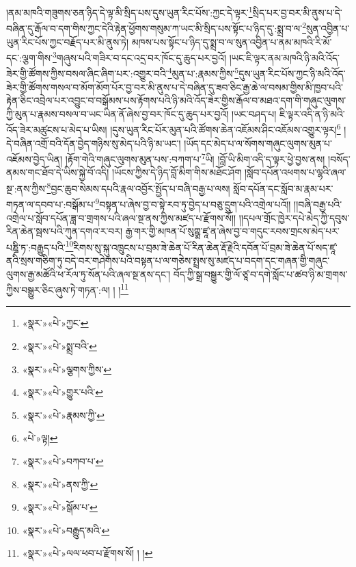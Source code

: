 །ནམ་མཁའི་གཟུགས་ཅན་ཉིད་དེ་ལྟ་མི་སྲིད་པས་དུས་ཡུན་རིང་པོས་:ཀྱང་དེ་ལྟར་\footnote{«སྣར་»«པེ་»ཀྱང་}སྲིད་པར་བྱ་བར་མི་ནུས་པ་དེ་བཞིན་དུ་རྒོལ་བ་དག་གིས་ཀྱང་དེའི་རྟེན་ཕྱོགས་གསུམ་ཀ་ཡང་མི་སྲིད་པས་སྟོང་པ་ཉིད་དུ་:སྨྲ་བ་ལ་\footnote{«སྣར་»«པེ་»སྨྲ་བའི་}སུན་འབྱིན་པ་ཡུན་རིང་པོས་ཀྱང་བརྗོད་པར་མི་ནུས་ཏེ། མཁས་པས་སྟོང་པ་ཉིད་དུ་སྨྲ་བ་ལ་སུན་འབྱིན་པ་ནམ་མཁའི་རི་མོ་དང་:ལྕག་གིས་\footnote{«སྣར་»«པེ་»ལྕགས་ཀྱིས་}གཞུས་པའི་གཟིར་བ་དང་འདྲ་བར་ཁོང་དུ་ཆུད་པར་བྱའོ། །ཡང་ཇི་ལྟར་ནམ་མཁའི་ཉི་མའི་འོད་ཟེར་གྱི་ཚོགས་ཀྱིས་བསལ་ཞིང་ཞིག་པར་:འགྱུར་བའི་\footnote{«སྣར་»«པེ་»གྱུར་པའི་}མུན་པ་:རྣམས་ཀྱིས་\footnote{«སྣར་»«པེ་»རྣམས་ཀྱི་}དུས་ཡུན་རིང་པོས་ཀྱང་ཉི་མའི་འོད་ཟེར་གྱི་ཚོགས་གསལ་བ་མོག་མོག་པོར་བྱ་བར་མི་ནུས་པ་དེ་བཞིན་དུ་ཟབ་ཅིང་རྒྱ་ཆེ་ལ་བསམ་གྱིས་མི་ཁྱབ་པའི་རྟེན་ཅིང་འབྲེལ་པར་འབྱུང་བ་བསྒོམས་པས་རྟོགས་པའི་ཉི་མའི་འོད་ཟེར་གྱིས་རྒོལ་བ་མཐའ་དག་གི་གཞུང་ལུགས་ཀྱི་མུན་པ་རྣམས་བསལ་བ་ཡང་ཡིན་ནོ་ཞེས་བྱ་བར་ཁོང་དུ་ཆུད་པར་བྱའོ། །ཡང་བཤད་པ། ཇི་ལྟར་འདི་ན་ཉི་མའི་འོད་ཟེར་མཚུངས་པ་མེད་པ་ཡིས། །དུས་ཡུན་རིང་པོར་མུན་པའི་ཚོགས་ཆེན་འཇོམས་ཤིང་འཇོམས་འགྱུར་ལྟར།\footnote{«པེ་»ལྟ།} །དེ་བཞིན་འགྲོ་བའི་དོན་བྱེད་གཉིས་སུ་མེད་པའི་ཉི་མ་ཡང་། །ཡོད་དང་མེད་པ་ལ་སོགས་གཞུང་ལུགས་མུན་པ་འཇོམས་བྱེད་ཡིན། །རྟོག་གེའི་གཞུང་ལུགས་མུན་པས་:བཀག་པ་\footnote{«སྣར་»«པེ་»བཀབ་པ་}ཡི། །བློ་ཡི་མིག་འདི་ད་ལྟར་ཕྱེ་བྱས་ནས། །བསོད་ནམས་གང་ཐོབ་དེ་ཡིས་སྐྱེ་བོ་འདི། །ཡོངས་ཀྱིས་དེ་ཉིད་བློ་མིག་གིས་མཐོང་ཤོག །སློབ་དཔོན་འཕགས་པ་ལྷའི་ཞལ་སྔ་:ནས་ཀྱིས་\footnote{«སྣར་»«པེ་»ནས་ཀྱི་}བྱང་ཆུབ་སེམས་དཔའི་རྣལ་འབྱོར་སྤྱོད་པ་བཞི་བརྒྱ་པ་ལས། སློབ་དཔོན་དང་སློབ་མ་རྣམ་པར་གཏན་ལ་དབབ་པ་:བསྒོམ་པ་\footnote{«སྣར་»«པེ་»སྒོམ་པ་}བསྟན་པ་ཞེས་བྱ་བ་སྟེ་རབ་ཏུ་བྱེད་པ་བཅུ་དྲུག་པའི་འགྲེལ་པའོ།། །།བཞི་བརྒྱ་པའི་འགྲེལ་པ་སློབ་དཔོན་ཟླ་བ་གྲགས་པའི་ཞལ་སྔ་ནས་ཀྱིས་མཛད་པ་རྫོགས་སོ།། །།དཔལ་གྲོང་ཁྱེར་དཔེ་མེད་ཀྱི་དབུས་རིན་ཆེན་སྦས་པའི་ཀུན་དགའ་ར་བར། རྒྱ་གར་གྱི་མཁན་པོ་སུཀྵྨ་ཛཱ་ན་ཞེས་བྱ་བ་གདུང་རབས་གྲངས་མེད་པར་པཎྜི་ཏ་:བརྒྱུད་པའི་\footnote{«སྣར་»«པེ་»བརྒྱུད་མའི་}རིགས་སུ་སྐུ་འཁྲུངས་པ་བྲམ་ཟེ་ཆེན་པོ་རིན་ཆེན་རྡོ་རྗེའི་དབོན་པོ་བྲམ་ཟེ་ཆེན་པོ་སད་ཛཱ་ནའི་སྲས་གཅིག་ཏུ་བདེ་བར་གཤེགས་པའི་བསྟན་པ་ལ་གཅེས་སྤྲས་སུ་མཛད་པ་བདག་དང་གཞན་གྱི་གཞུང་ལུགས་རྒྱ་མཚོའི་ཕ་རོལ་ཏུ་སོན་པའི་ཞལ་སྔ་ནས་དང་། བོད་ཀྱི་སྒྲ་བསྒྱུར་གྱི་ལོ་ཙཱ་བ་དགེ་སློང་པ་ཚབ་ཉི་མ་གྲགས་ཀྱིས་བསྒྱུར་ཅིང་ཞུས་ཏེ་གཏན་:ལ། ། །\footnote{«སྣར་»«པེ་»ལལ་ཕབ་པ་རྫོགས་སོ། ། །}